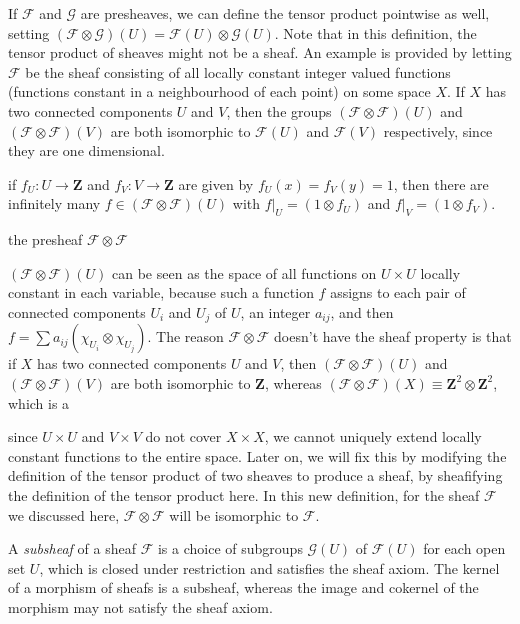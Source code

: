 \begin{example}
    If $\mathcal{F}$ and $\mathcal{G}$ are presheaves, we can define the tensor product pointwise as well, setting $(\mathcal{F} \otimes \mathcal{G})(U) = \mathcal{F}(U) \otimes \mathcal{G}(U)$. Note that in this definition, the tensor product of sheaves might not be a sheaf. An example is provided by letting $\mathcal{F}$ be the sheaf consisting of all locally constant integer valued functions (functions constant in a neighbourhood of each point) on some space $X$. If $X$ has two connected components $U$ and $V$, then the groups $(\mathcal{F} \otimes \mathcal{F})(U)$ and $(\mathcal{F} \otimes \mathcal{F})(V)$ are both isomorphic to $\mathcal{F}(U)$ and $\mathcal{F}(V)$ respectively, since they are one dimensional.

    if $f_U: U \to \mathbf{Z}$ and $f_V: V \to \mathbf{Z}$ are given by $f_U(x) = f_V(y) = 1$, then there are infinitely many $f \in (\mathcal{F} \otimes \mathcal{F})(U)$ with $f|_U = (1 \otimes f_U)$ and $f|_V = (1 \otimes f_V)$.

    the presheaf $\mathcal{F} \otimes \mathcal{F}$

    $(\mathcal{F} \otimes \mathcal{F})(U)$ can be seen as the space of all functions on $U \times U$ locally constant in each variable, because such a function $f$ assigns to each pair of connected components $U_i$ and $U_j$ of $U$, an integer $a_{ij}$, and then $f = \sum a_{ij} (\chi_{U_i} \otimes \chi_{U_j})$. The reason $\mathcal{F} \otimes \mathcal{F}$ doesn't have the sheaf property is that if $X$ has two connected components $U$ and $V$, then $(\mathcal{F} \otimes \mathcal{F})(U)$ and $(\mathcal{F} \otimes \mathcal{F})(V)$ are both isomorphic to $\mathbf{Z}$, whereas $(\mathcal{F} \otimes \mathcal{F})(X) \equiv \mathbf{Z}^2 \otimes \mathbf{Z}^2$, which is a 

    since $U \times U$ and $V \times V$ do not cover $X \times X$, we cannot uniquely extend locally constant functions to the entire space. Later on, we will fix this by modifying the definition of the tensor product of two sheaves to produce a sheaf, by sheafifying the definition of the tensor product here. In this new definition, for the sheaf $\mathcal{F}$ we discussed here, $\mathcal{F} \otimes \mathcal{F}$ will be isomorphic to $\mathcal{F}$.
\end{example}

A \emph{subsheaf} of a sheaf $\mathcal{F}$ is a choice of subgroups $\mathcal{G}(U)$ of $\mathcal{F}(U)$ for each open set $U$, which is closed under restriction and satisfies the sheaf axiom. The kernel of a morphism of sheafs is a subsheaf, whereas the image and cokernel of the morphism may not satisfy the sheaf axiom.

